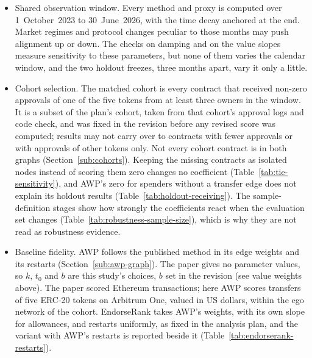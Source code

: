 \begin{itemize}
\item Shared observation window. Every method and proxy is computed over 1~October~2023 to 30~June~2026, with the time decay anchored at the end. Market regimes and protocol changes peculiar to those months may push alignment up or down. The checks on damping and on the value slopes measure sensitivity to these parameters, but none of them varies the calendar window, and the two holdout freezes, three months apart, vary it only a little.
\item Cohort selection. The matched cohort is every contract that received non-zero approvals of one of the five tokens from at least three owners in the window. It is a subset of the plan's cohort, taken from that cohort's approval logs and code check, and was fixed in the revision before any revised score was computed; results may not carry over to contracts with fewer approvals or with approvals of other tokens only. Not every cohort contract is in both graphs (Section~\ref{sub:cohorts}). Keeping the missing contracts as isolated nodes instead of scoring them zero changes no coefficient (Table~\ref{tab:tie-sensitivity}), and AWP's zero for spenders without a transfer edge does not explain its holdout results (Table~\ref{tab:holdout-receiving}). The sample-definition stages show how strongly the coefficients react when the evaluation set changes (Table~\ref{tab:robustness-sample-size}), which is why they are not read as robustness evidence.
\item Baseline fidelity. AWP follows the published method in its edge weights and its restarts (Section~\ref{sub:awp-graph}). The paper gives no parameter values, so $k$, $t_0$ and $b$ are this study's choices, $b$ set in the revision (see value weights above). The paper scored Ethereum transactions; here AWP scores transfers of five ERC-20 tokens on Arbitrum One, valued in US dollars, within the ego network of the cohort. EndorseRank takes AWP's weights, with its own slope for allowances, and restarts uniformly, as fixed in the analysis plan, and the variant with AWP's restarts is reported beside it (Table~\ref{tab:endorserank-restarts}).

\end{itemize}
